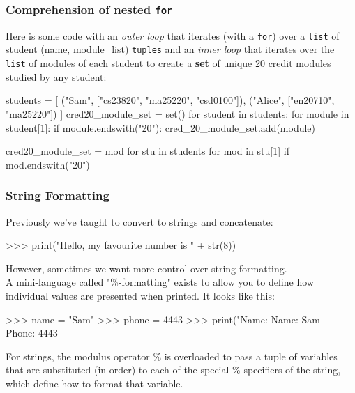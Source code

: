 \documentclass{beamer}
\begin{document}
\begin{frame}[fragile]
\frametitle{Comprehension of nested \texttt{for}}
Here is some code with an \textit{outer loop} that iterates (with a \texttt{for})
over a \texttt{list} of student (name, module\_list) \texttt{tuples} and an
\textit{inner loop} that iterates over the \texttt{list} of modules of each student
to create a \textbf{set} of unique 20 credit modules studied by any student:

\begin{code}
students = [
    ("Sam", ["cs23820", "ma25220", "csd0100"]),
    ("Alice", ["en20710", "ma25220"])
]
cred20_module_set = set()
for student in students:
    for module in student[1]:
        if module.endswith("20"):
            cred_20_module_set.add(module)
\end{code}

\begin{code}
cred20_module_set = {mod for stu in students
     for mod in stu[1] if mod.endswith("20")}
\end{code}
\end{frame}


\begin{frame}[fragile]
\frametitle{String Formatting}
Previously we've taught to convert to strings and concatenate:
\begin{code}
>>> print("Hello, my favourite number is " + str(8))
\end{code}

\vskip 0.3cm
However, sometimes we want more control over string formatting.\\
A mini-language called "\%-formatting" exists to allow you to define how individual
values are presented when printed.
It looks like this:

\begin{code}
>>> name = "Sam"
>>> phone = 4443
>>> print("Name: %
Name: Sam - Phone: 4443
\end{code}

For strings, the modulus operator \%
is overloaded to pass a tuple of variables that are substituted (in order)
to each of the
special \% specifiers of the string, which define how to format that variable.
\end{frame}
\end{document}
